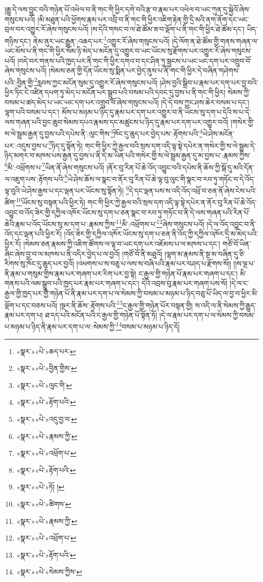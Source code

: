 །རྒྱུ་དེ་ལས་བྱུང་བའི་གཉེན་པོ་འཕེལ་བ་ནི་གང་གི་ཕྱིར་དགེ་བའི་རྩ་བ་རྣམ་པར་འཕེལ་བ་ཡང་ཀུན་དུ་སྐྱེའོ་ཞེས་གསུངས་པའོ། །མི་མཐུན་པའི་ཕྱོགས་རྣམ་པར་འབྲི་བ་ནི་གང་གི་ཕྱིར་འཇིག་རྟེན་གྱི་དྲི་མའི་ནག་ནོག་དང་ཡང་བྲལ་བར་འགྱུར་རོ་ཞེས་གསུངས་པའོ། །ས་དེའི་གསང་བ་ལ་ཐེ་ཚོམ་ཟ་བ་ལྡོག་པ་ནི་གང་གི་ཕྱིར་ཐེ་ཚོམ་དང་། ཡིད་གཉིས་དང་། ནེམ་ནུར་ཡང་རྒྱུན་:འཆད་པར་\footnote{«སྣར་»«པེ་»ཆད་པར་}འགྱུར་རོ་ཞེས་གསུངས་པའོ། །དེ་ལོག་ན་ཐེ་ཚོམ་གྱི་གནས་གཞན་ལ་ཡང་མོས་པ་ནི་གང་གི་ཕྱིར་སོམ་ཉི་མེད་པ་མངོན་དུ་འགྱུར་བ་ཡང་ཡོངས་སུ་རྫོགས་པར་འགྱུར་རོ་ཞེས་གསུངས་པའོ། །བདེ་བར་གནས་པའི་ཁྱད་པར་ནི་གང་གི་ཕྱིར་དགའ་བ་དང་ཤིན་ཏུ་སྦྱངས་པ་ཡང་ཡང་དག་པར་འགྲུབ་བོ་ཞེས་གསུངས་པའོ། །སེམས་ཅན་གྱི་དོན་ཡོངས་སུ་སྨིན་པར་བྱེད་ནུས་པ་ནི་གང་གི་ཕྱིར་དེ་བཞིན་གཤེགས་པའི་:བྱིན་གྱི་\footnote{«སྣར་»«པེ་»བྱིན་གྱིས་}རླབས་ཀྱང་མངོན་སུམ་དུ་འགྱུར་རོ་ཞེས་གསུངས་པའོ། །ཤེས་བྱའི་སྒྲིབ་པ་རྣམ་པར་དག་པར་བྱ་བའི་ཕྱིར་ཏིང་ངེ་འཛིན་དཔག་ཏུ་མེད་པ་མངོན་པར་སྒྲུབ་པའི་བསམ་པའི་དབང་དུ་བྱས་པ་ནི་གང་གི་ཕྱིར། སེམས་ཀྱི་བསམ་པ་ཚད་མེད་པ་ཡང་ཡང་དག་པར་འགྲུབ་བོ་ཞེས་གསུངས་པའོ། །དེ་དེ་བས་ཀྱང་ཤས་ཆེར་བསམ་པ་དང་། ལྷག་པའི་བསམ་པ་དང་། མོས་པ་མཉམ་པ་ཉིད་དུ་རྣམ་པར་དག་པར་འགྱུར་བ་ནི་ཡོངས་སུ་དག་པ་དེའི་ས་པ་དེ་ལས་གཞན་པའི་བྱང་ཆུབ་སེམས་དཔའ་རྣམས་དང་མཚུངས་པ་ཉིད་དུ་རྣམ་པར་དག་པར་འགྱུར་བའོ། །གསེར་གྱི་ས་ལེ་སྦྲམ་རྒྱན་དུ་བྱས་པའི་དཔེས་ནི་:ལུང་གིས་\footnote{«སྣར་»«པེ་»ལུང་གི་}ཁོང་དུ་ཆུད་པར་བྱེད་པས་:རྟོགས་པའི་\footnote{«སྣར་»«པེ་»རྟོག་པའི་}ཡེ་ཤེས་མངོན་པར་:འདུས་བྱས་པ་\footnote{«སྣར་»«པེ་»འདུ་བྱ་བ་}ཉིད་དུ་སྟོན་ཏེ། གང་གི་ཕྱིར་ཀྱེ་རྒྱལ་བའི་སྲས་དག་འདི་ལྟ་སྟེ་དཔེར་ན་གསེར་གྱི་ས་ལེ་སྦྲམ་དེ་ཉིད་མགར་བ་མཁས་པས་རྒྱན་དུ་བྱས་པ་ནི་དེ་མ་ཡིན་པའི་གསེར་གྱི་ས་ལེ་སྦྲམ་རྒྱན་དུ་མ་བྱས་པ་:རྣམས་ཀྱིས་\footnote{«སྣར་»«པེ་»རྣམས་ཀྱི་}མི་:འཕྲོགས་པ་\footnote{«སྣར་»«པེ་»འཕྲོག་པ་}ཡིན་ནོ་ཞེས་གསུངས་པའོ། །ནོར་བུ་རིན་པོ་ཆེ་འོད་འབྱུང་བའི་དཔེས་ནི་ཆོས་ཀྱི་སྒོ་དུ་མའི་དོན་ལ་འཇུག་པས་:རྟོགས་པའི་\footnote{«སྣར་»«པེ་»རྟོག་པའི་}ཡེ་ཤེས་ཆོས་ལ་སྣང་བ་ནོར་བུ་རིན་པོ་ཆེ་ལྟ་བུ་ལུང་གི་སྣང་བ་རབ་ཏུ་གཏོང་བ་དེ་འོད་ལྟ་བུའི་ཡེ་ཤེས་རྒྱས་པ་དང་ལྡན་པར་ཡོངས་སུ་སྟོན་ཏེ། \footnote{«སྣར་»«པེ་»ཏོ། ། }དེ་དང་ལྡན་པས་ས་འདི་འོད་འཕྲོ་བ་ཅན་ནོ་ཞེས་ངེས་པའི་ཚིག་\footnote{«སྣར་»«པེ་»ཚིགས་}ཡོངས་སུ་བསྟན་པའི་ཕྱིར་ཏེ། གང་གི་ཕྱིར་ཀྱེ་རྒྱལ་བའི་སྲས་དག་འདི་ལྟ་སྟེ་དཔེར་ན་ནོར་བུ་རིན་པོ་ཆེ་འོད་འབྱུང་བ་འོད་ཟེར་གྱི་དཀྱིལ་འཁོར་ཡོངས་སུ་དག་པ་ཅན་སྣང་བ་རབ་ཏུ་གཏོང་བ་ནི་དེ་ལས་གཞན་པའི་རིན་པོ་ཆེའི་རྣམ་པ་འོད་ཡོངས་སུ་མ་དག་པ་:རྣམས་ཀྱིས་\footnote{«སྣར་»«པེ་»རྣམས་ཀྱི་}མི་:འཕྲོགས་པ་\footnote{«སྣར་»«པེ་»འཕྲོག་པ་}ཞེས་གསུངས་པའོ། །དེ་ལ་འོད་འབྱུང་བ་ནི་འོད་དང་ལྡན་པའི་ཕྱིར་རོ། །འོད་ཟེར་གྱི་དཀྱིལ་འཁོར་ཡོངས་སུ་དག་པ་ཅན་ནི་འོད་ཀྱི་དཀྱིལ་འཁོར་དྲི་མ་མེད་པའི་ཕྱིར་རོ། །སེམས་ཅན་རྣམས་ཀྱི་འཇིག་ཚོགས་ལ་ལྟ་བ་ཡང་དག་པར་འཇོམས་པ་ལ་མཁས་པ་དང་། གཙོ་བོ་ཡིན་ཞིང་ཞེས་བྱ་བ་ལ་མཁས་པ་ནི་འདིར་བྱེད་པ་ལ་བྱའོ། །གཙོ་བོ་ནི་མཐུའོ། །ལྷག་མ་རྣམས་ནི་སྔ་མ་བཞིན་དུ་ཅི་རིགས་སུ་ཁོང་དུ་ཆུད་པར་བྱའོ། །འཕགས་པ་ས་བཅུ་པ་ལས་ས་བཞི་པའི་རྣམ་པར་བཤད་པ་རྫོགས་སོ།། །།ས་ལྔ་པ་ནི་རྣམ་པ་གསུམ་གྱིས་རྣམ་པར་གཞག་པར་རིག་པར་བྱ་སྟེ། ང་རྒྱལ་གྱི་གཉེན་པོ་རྣམ་པར་གཞག་པ་དང་། མི་གནས་པའི་ལམ་སྒྲུབ་པའི་ཁྱད་པར་རྣམ་པར་གཞག་པ་དང་། དེའི་འབྲས་བུ་རྣམ་པར་གཞག་པས་སོ། །དེ་ལ་ང་རྒྱལ་གྱི་ཁྱད་པར་གྱི་གཉེན་པོ་ནི་རྣམ་པར་དག་པ་ལ་སེམས་ཀྱི་བསམ་པ་མཉམ་པ་ཉིད་བཅུ་པོ་ཡིད་ལ་བྱ་བ་ཕྱིར་མི་ལྡོག་པ་དང་བཅས་པའོ། །སྔར་ནི་ཆོས་:རྟོགས་པའི་\footnote{«སྣར་»«པེ་»རྟོག་པའི་}ང་རྒྱལ་གྱི་གཉེན་པོར་བསྟན་གྱི། ས་འདི་ལ་ནི་སེམས་ཀྱི་རྒྱུད་རྣམ་པར་དག་པ། ཐ་དད་པའི་མངོན་པའི་ང་རྒྱལ་གྱི་གཉེན་པོ་སྟོན་ཏོ། །དེ་ལ་རྣམ་པར་དག་པ་ལ་སེམས་ཀྱི་བསམ་པ་མཉམ་པ་ཉིད་ནི་རྣམ་པར་དག་པ་ལ་:སེམས་ཀྱི་\footnote{«སྣར་»«པེ་»སེམས་ཀྱིས་}བསམ་པ་མཉམ་པ་ཉིད་དོ། 